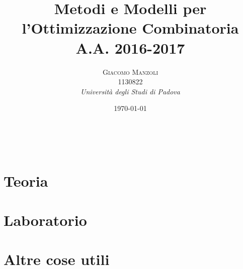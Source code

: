 \documentclass[a4paper, 11pt]{report} %
\title{\textbf{Metodi e Modelli per l'Ottimizzazione Combinatoria}\\ %
	A.A. 2016-2017 } %
\author{\textsc{Giacomo Manzoli}
	\\ 1130822 %
	\\{\textit{Università degli Studi di Padova}}} %
\date{\today} %
\makeatletter
\renewcommand{\maketitle}{ %
	\begin{flushright} %
		{\LARGE\@title} %
		
		\vspace{50pt} %
		
		{\large\@author} %
		\\\@date %
		
		\vspace{100pt} %
	\end{flushright}
}
\makeatother
\begin{document}
	
	\maketitle %

	
	
	\clearpage
	\tableofcontents
	
	
	\vspace{30pt} %
	
	\clearpage
	
	\part{Teoria}

	
	
	
	
	
	\part{Laboratorio}
	
	
	\part{Altre cose utili}
	
	
	
	\printindex
	
	
\end{document}
